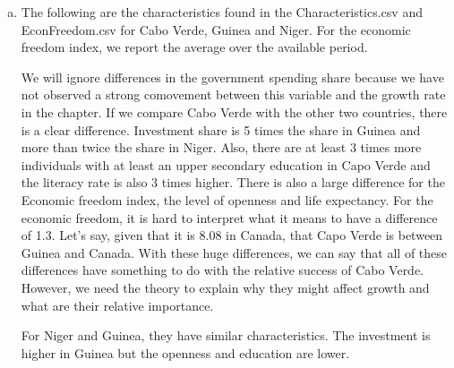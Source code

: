 \documentclass[letterpaper]{article}\usepackage[]{graphicx}\usepackage[]{color}
\numberwithin{exer}{section}
\theoremstyle{nonumberplain}
\begin{document}
\begin{enumerate}[a)]
\begin{center}
\end{center}
\item The following are the characteristics found in the
  Characteristics.csv and EconFreedom.csv for Cabo Verde, Guinea and
  Niger. For the economic freedom index, we report the average over
  the available period.
\begin{center}  
\end{center}
We will ignore differences in the government spending share because we
have not observed a strong comovement between this variable and the
growth rate in the chapter. If we compare Cabo Verde with the other two
countries, there is a clear difference. Investment share is 5 times
the share in Guinea and more than twice the share in Niger. Also,
there are at least 3 times more individuals with at least an upper
secondary education in Capo Verde and the literacy rate is also 3
times higher. There is also a large difference for the Economic
freedom index, the level of openness and life expectancy. For the
economic freedom, it is hard to interpret what it means to have a
difference of 1.3. Let's say, given that it is 8.08 in Canada, that
Capo Verde is between Guinea and Canada. With these huge differences,
we can say that all of these differences have something to do with the
relative success of Cabo Verde. However, we need the theory to explain
why they might affect growth and what are their relative importance.

For Niger and Guinea, they have similar characteristics. The
investment is higher in Guinea but the openness and education are
lower.
\end{enumerate}
\end{document}
